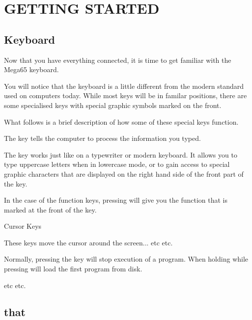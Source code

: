 \chapter{GETTING STARTED}
\section{Keyboard}

Now that you have everything connected, it is time to get familiar with the Mega65 keyboard.

You will notice that the keyboard is a little different from the modern standard used on computers today. While most keys will be in familar positions, there are some specialised keys with special graphic symbols marked on the front.

What follows is a brief description of how some of these special keys function.

 \vspace*{1cm}


The  key tells the computer to process the information you typed.

 \vspace*{1cm}


The  key works just like on a typewriter or modern keyboard. It allows you to type uppercase letters when in lowercase mode, or to gain access to special graphic characters that are displayed on the right hand side of the front part of the key.

In the case of the function keys, pressing  will give you the function that is marked at the front of the key.

 \vspace*{1cm}

\megakey{$\leftarrow$} \megakey{$\uparrow$} \megakey{$\rightarrow$} \megakey{$\downarrow$} Cursor Keys

These keys move the cursor around the screen... etc etc.

 \vspace*{1cm}


Normally, pressing the  key will stop execution of a program. When holding  while pressing  will load the first program from disk.

 \vspace*{1cm}


etc etc.


\section{that}


